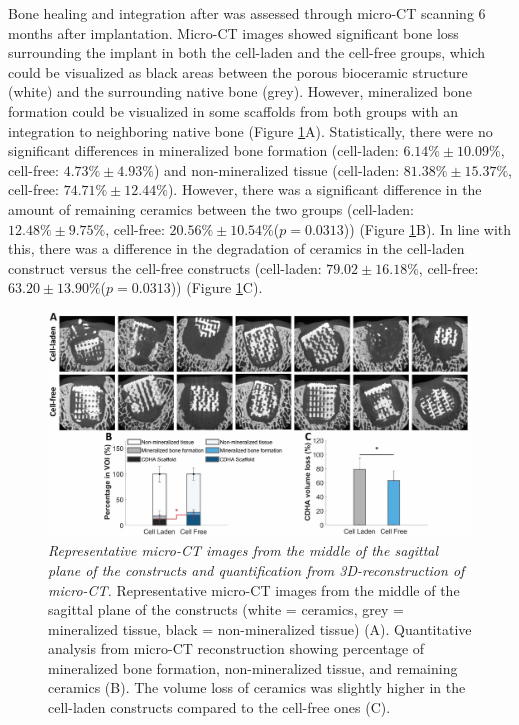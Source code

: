 \documentclass[twocolumn, serif, empirical, authordate, seplic]{jote-article}
\begin{document}
Bone healing and integration after was assessed through micro-CT scanning 6 months after implantation. Micro-CT images showed significant bone loss surrounding the implant in both the cell-laden and the cell-free groups, which could be visualized as black areas between the porous bioceramic structure (white) and the surrounding native bone (grey). However, mineralized bone formation could be visualized in some scaffolds from both groups with an integration to neighboring native bone (Figure \ref{fig:figure10}A). Statistically, there were no significant differences in mineralized bone formation (cell-laden: $6.14\% \pm 10.09\%$, cell-free: $4.73\% \pm 4.93\%$) and non-mineralized tissue (cell-laden:  $ 81.38\% \pm 15.37\% $, cell-free:  $ 74.71\% \pm 12.44\%$). However, there was a significant difference in the amount of remaining ceramics between the two groups (cell-laden:  $ 12.48\% \pm 9.75\% $, cell-free:  $ 20.56\% \pm 10.54\% $($p = 0.0313$)) (Figure \ref{fig:figure10}B). In line with this, there was a difference in the degradation of ceramics in the cell-laden construct versus the cell-free constructs (cell-laden:  $ 79.02 \pm 16.18 \% $, cell-free:  $ 63.20 \pm 13.90 \% $($p = 0.0313$)) (Figure \ref{fig:figure10}C).

\begin{figure}[t]
\centering \includegraphics[width=\textwidth]{articles/empirical/horse/media/image10.jpg}
\caption{\emph{Representative micro-CT images from the middle of the sagittal plane of the constructs and quantification from 3D-reconstruction of micro-CT.} Representative micro-CT images from the middle of the sagittal plane of the constructs (white = ceramics, grey = mineralized tissue, black = non-mineralized tissue) (A). Quantitative analysis from micro-CT reconstruction showing percentage of mineralized bone formation, non-mineralized tissue, and remaining ceramics (B). The volume loss of ceramics was slightly higher in the cell-laden constructs compared to the cell-free ones (C).}
\label{fig:figure10}\end{figure}
\end{document}
